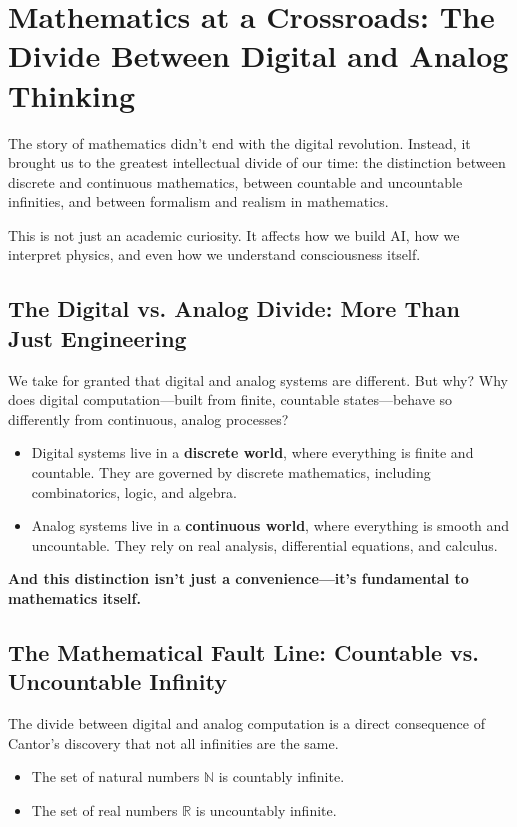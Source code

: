 \section{Mathematics at a Crossroads: The Divide Between Digital and Analog Thinking}

The story of mathematics didn’t end with the digital revolution. Instead, it brought us to the greatest intellectual divide of our time: the distinction between discrete and continuous mathematics, between countable and uncountable infinities, and between formalism and realism in mathematics. 

This is not just an academic curiosity. It affects how we build AI, how we interpret physics, and even how we understand consciousness itself.

\subsection{The Digital vs. Analog Divide: More Than Just Engineering}

We take for granted that digital and analog systems are different. But why? Why does digital computation—built from finite, countable states—behave so differently from continuous, analog processes?

\begin{itemize}
    \item Digital systems live in a \textbf{discrete world}, where everything is finite and countable. They are governed by discrete mathematics, including combinatorics, logic, and algebra.
    \item Analog systems live in a \textbf{continuous world}, where everything is smooth and uncountable. They rely on real analysis, differential equations, and calculus.
\end{itemize}

\textbf{And this distinction isn’t just a convenience—it’s fundamental to mathematics itself.} 

\subsection{The Mathematical Fault Line: Countable vs. Uncountable Infinity}

The divide between digital and analog computation is a direct consequence of Cantor’s discovery that not all infinities are the same.

\begin{itemize}
    \item The set of natural numbers \( \mathbb{N} \) is countably infinite.
    \item The set of real numbers \( \mathbb{R} \) is uncountably infinite.
\end{itemize}

